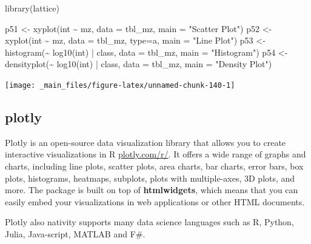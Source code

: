 \documentclass[
]{book}
\newenvironment{Shaded}{\begin{snugshade}}{\end{snugshade}}
\newcommand{\AttributeTok}[1]{\textcolor[rgb]{0.77,0.63,0.00}{#1}}
\newcommand{\FunctionTok}[1]{\textcolor[rgb]{0.00,0.00,0.00}{#1}}
\newcommand{\NormalTok}[1]{#1}
\newcommand{\OtherTok}[1]{\textcolor[rgb]{0.56,0.35,0.01}{#1}}
\newcommand{\SpecialCharTok}[1]{\textcolor[rgb]{0.00,0.00,0.00}{#1}}
\newcommand{\StringTok}[1]{\textcolor[rgb]{0.31,0.60,0.02}{#1}}
\begin{document}
\begin{Shaded}
\begin{Highlighting}[]
\FunctionTok{library}\NormalTok{(lattice)}

\NormalTok{p51 }\OtherTok{\textless{}{-}} \FunctionTok{xyplot}\NormalTok{(int }\SpecialCharTok{\textasciitilde{}}\NormalTok{ mz, }\AttributeTok{data =}\NormalTok{ tbl\_mz, }\AttributeTok{main =} \StringTok{"Scatter Plot"}\NormalTok{)}
\NormalTok{p52 }\OtherTok{\textless{}{-}} \FunctionTok{xyplot}\NormalTok{(int }\SpecialCharTok{\textasciitilde{}}\NormalTok{ mz, }\AttributeTok{data =}\NormalTok{ tbl\_mz, }\AttributeTok{type=}\StringTok{\textquotesingle{}a\textquotesingle{}}\NormalTok{, }\AttributeTok{main =} \StringTok{"Line Plot"}\NormalTok{)}
\NormalTok{p53 }\OtherTok{\textless{}{-}} \FunctionTok{histogram}\NormalTok{(}\SpecialCharTok{\textasciitilde{}} \FunctionTok{log10}\NormalTok{(int) }\SpecialCharTok{|}\NormalTok{ class, }\AttributeTok{data =}\NormalTok{ tbl\_mz, }\AttributeTok{main =} \StringTok{"Histogram"}\NormalTok{)}
\NormalTok{p54 }\OtherTok{\textless{}{-}} \FunctionTok{densityplot}\NormalTok{(}\SpecialCharTok{\textasciitilde{}} \FunctionTok{log10}\NormalTok{(int) }\SpecialCharTok{|}\NormalTok{ class, }\AttributeTok{data =}\NormalTok{ tbl\_mz, }\AttributeTok{main =} \StringTok{"Density Plot"}\NormalTok{)}
\end{Highlighting}
\end{Shaded}

\begin{center}\texttt{[image: \_main\_files/figure-latex/unnamed-chunk-140-1]} \end{center}

\hypertarget{plotly}{%
\subsection*{plotly}\label{plotly}}

Plotly is an open-source data visualization library that allows you to create interactive visualizations in R \href{https://plotly.com/r/}{plotly.com/r/}. It offers a wide range of graphs and charts, including line plots, scatter plots, area charts, bar charts, error bars, box plots, histograms, heatmaps, subplots, plots with multiple-axes, 3D plots, and more. The package is built on top of \textbf{htmlwidgets}, which means that you can easily embed your visualizations in web applications or other HTML documents.

Plotly also nativity supports many data science languages such as R, Python, Julia, Java-script, MATLAB and F\#.
\end{document}
